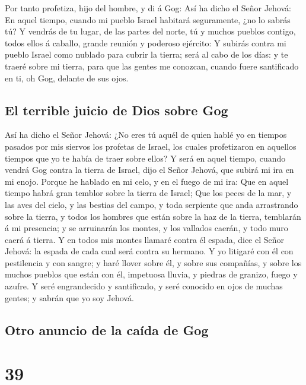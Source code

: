  Por tanto profetiza, hijo del hombre, y di á Gog: Así ha
dicho el Señor Jehová: En aquel tiempo, cuando mi pueblo Israel habitará
seguramente, ¿no lo sabrás tú?  Y vendrás de tu lugar, de
las partes del norte, tú y muchos pueblos contigo, todos ellos á
caballo, grande reunión y poderoso ejército:  Y subirás
contra mi pueblo Israel como nublado para cubrir la tierra; será al cabo
de los días: y te traeré sobre mi tierra, para que las gentes me
conozcan, cuando fuere santificado en ti, oh Gog, delante de sus ojos.

\hypertarget{el-terrible-juicio-de-dios-sobre-gog}{%
\subsection{El terrible juicio de Dios sobre
Gog}\label{el-terrible-juicio-de-dios-sobre-gog}}

 Así ha dicho el Señor Jehová: ¿No eres tú aquél de quien
hablé yo en tiempos pasados por mis siervos los profetas de Israel, los
cuales profetizaron en aquellos tiempos que yo te había de traer sobre
ellos?  Y será en aquel tiempo, cuando vendrá Gog contra la
tierra de Israel, dijo el Señor Jehová, que subirá mi ira en mi enojo.
 Porque he hablado en mi celo, y en el fuego de mi ira: Que
en aquel tiempo habrá gran temblor sobre la tierra de Israel;
 Que los peces de la mar, y las aves del cielo, y las
bestias del campo, y toda serpiente que anda arrastrando sobre la
tierra, y todos los hombres que están sobre la haz de la tierra,
temblarán á mi presencia; y se arruinarán los montes, y los vallados
caerán, y todo muro caerá á tierra.  Y en todos mis montes
llamaré contra él espada, dice el Señor Jehová: la espada de cada cual
será contra su hermano.  Y yo litigaré con él con
pestilencia y con sangre; y haré llover sobre él, y sobre sus compañías,
y sobre los muchos pueblos que están con él, impetuosa lluvia, y piedras
de granizo, fuego y azufre.  Y seré engrandecido y
santificado, y seré conocido en ojos de muchas gentes; y sabrán que yo
soy Jehová.

\hypertarget{otro-anuncio-de-la-cauxedda-de-gog}{%
\subsection{Otro anuncio de la caída de
Gog}\label{otro-anuncio-de-la-cauxedda-de-gog}}

\hypertarget{section-38}{%
\section{39}\label{section-38}}

